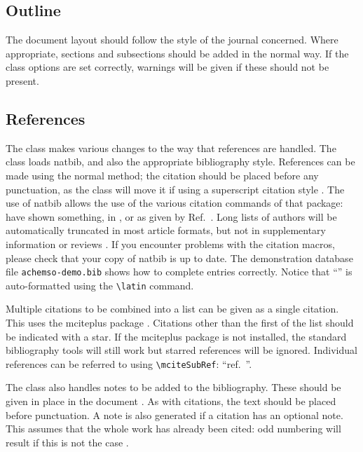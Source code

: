 \documentclass[journal=jacsat,manuscript=article]{achemso}
\begin{document}
\subsection{Outline}

The document layout should follow the style of the journal concerned.
Where appropriate, sections and subsections should be added in the
normal way. If the class options are set correctly, warnings will be
given if these should not be present.

\subsection{References}

The class makes various changes to the way that references are
handled.  The class loads \textsf{natbib}, and also the
appropriate bibliography style.  References can be made using
the normal method; the citation should be placed before any
punctuation, as the class will move it if using a superscript
citation style
\cite{Mena2000,Abernethy2003,Friedman-Hill2003,EuropeanCommission2008}.
The use of \textsf{natbib} allows the use of the various citation
commands of that package: \citeauthor{Abernethy2003} have shown
something, in \citeyear{Cotton1999}, or as given by
Ref.~.  Long lists of authors will be
automatically truncated in most article formats, but not in
supplementary information or reviews \cite{Pople2003}. If you
encounter problems with the citation macros, please check that
your copy of \textsf{natbib} is up to date. The demonstration
database file \texttt{achemso-demo.bib} shows how to complete
entries correctly. Notice that ``'' is auto-formatted
using the \texttt{\textbackslash latin} command.

Multiple citations to be combined into a list can be given as
a single citation.  This uses the \textsf{mciteplus} package
\cite{Johnson1972,*Arduengo1992,*Eisenstein2005,*Arduengo1994}.
Citations other than the first of the list should be indicated
with a star. If the \textsf{mciteplus} package is not installed,
the standard bibliography tools will still work but starred
references will be ignored. Individual references can be referred
to using \texttt{\textbackslash mciteSubRef}:
``ref.~''.

The class also handles notes to be added to the bibliography.  These
should be given in place in the document .  As with
citations, the text should be placed before punctuation.  A note is
also generated if a citation has an optional note.  This assumes that
the whole work has already been cited: odd numbering will result if
this is not the case \cite[p.~1]{Cotton1999}.
\end{document}
